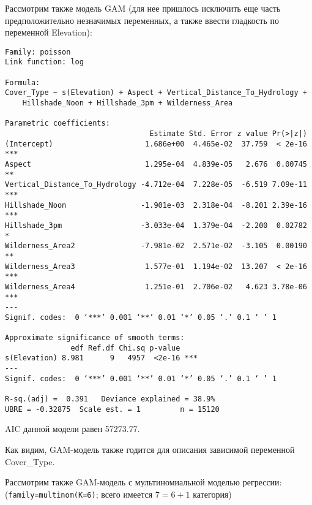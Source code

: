 \documentclass[12pt]{article}
\begin{document}
Рассмотрим также модель GAM (для нее пришлось исключить еще часть предположительно незначимых переменных, а также ввести гладкость
по переменной Elevation):
\begin{verbatim}
Family: poisson
Link function: log

Formula:
Cover_Type ~ s(Elevation) + Aspect + Vertical_Distance_To_Hydrology +
    Hillshade_Noon + Hillshade_3pm + Wilderness_Area

Parametric coefficients:
                                 Estimate Std. Error z value Pr(>|z|)
(Intercept)                     1.686e+00  4.465e-02  37.759  < 2e-16 ***
Aspect                          1.295e-04  4.839e-05   2.676  0.00745 **
Vertical_Distance_To_Hydrology -4.712e-04  7.228e-05  -6.519 7.09e-11 ***
Hillshade_Noon                 -1.901e-03  2.318e-04  -8.201 2.39e-16 ***
Hillshade_3pm                  -3.033e-04  1.379e-04  -2.200  0.02782 *
Wilderness_Area2               -7.981e-02  2.571e-02  -3.105  0.00190 **
Wilderness_Area3                1.577e-01  1.194e-02  13.207  < 2e-16 ***
Wilderness_Area4                1.251e-01  2.706e-02   4.623 3.78e-06 ***
---
Signif. codes:  0 ‘***’ 0.001 ‘**’ 0.01 ‘*’ 0.05 ‘.’ 0.1 ‘ ’ 1

Approximate significance of smooth terms:
               edf Ref.df Chi.sq p-value
s(Elevation) 8.981      9   4957  <2e-16 ***
---
Signif. codes:  0 ‘***’ 0.001 ‘**’ 0.01 ‘*’ 0.05 ‘.’ 0.1 ‘ ’ 1

R-sq.(adj) =  0.391   Deviance explained = 38.9%
UBRE = -0.32875  Scale est. = 1         n = 15120
\end{verbatim}
AIC данной модели равен 57273.77.

Как видим, GAM-модель также годится для описания зависимой переменной Cover\_Type.

Рассмотрим также GAM-модель с мультиномиальной моделью регрессии:
(\verb|family=multinom(K=6)|; всего имеется $7 = 6 + 1$ категория)
\end{document}
